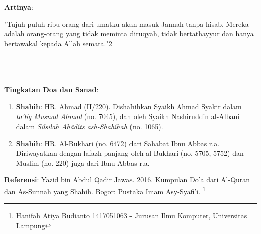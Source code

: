 \documentclass[a4paper,12pt]{article}
\begin{document}
\noindent
\textbf{Artinya}:
\par
\indent
"Tujuh puluh ribu orang dari umatku akan masuk Jannah tanpa hisab. Mereka 
adalah orang-orang yang tidak meminta diruqyah, tidak bertathayyur dan 
hanya bertawakal kepada Allah semata."{\scriptsize 2}\\\\\\\\
\par
\noindent
\textbf{Tingkatan Doa dan Sanad}:
\begin{enumerate}
\item \textbf{Shahih}: HR. Ahmad (II/220). Dishahihkan Syaikh Ahmad Syakir 
dalam \textit{ta'liq Musnad Ahmad} (no. 7045), dan oleh Syaikh Nashiruddin 
al-Albani dalam \textit{Silsilah Ah\^{a}d\^{i}ts ash-Shah\^{i}hah} (no. 
1065).
\item \textbf{Shahih}: HR. Al-Bukhari (no. 6472) dari Sahabat Ibnu Abbas 
r.a. Diriwayatkan dengan lafazh panjang oleh al-Bukhari (no. 5705, 5752) 
dan Muslim (no. 220) juga dari Ibnu Abbas r.a.
\end{enumerate}
\textbf{Referensi}: Yazid bin Abdul Qadir Jawas. 2016. Kumpulan Do'a dari
Al-Quran dan As-Sunnah yang Shahih. Bogor: Pustaka Imam Asy-Syafi'i.
\footnote{Hanifah Atiya Budianto 1417051063 - Jurusan Ilmu Komputer,
Universitas Lampung}
\end{document}

